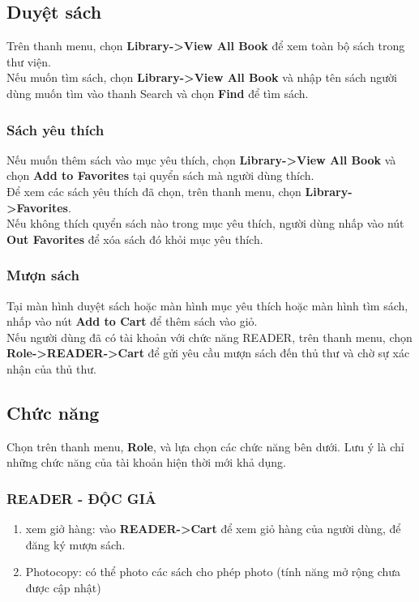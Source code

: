 \documentclass[12pt,a4paper]{report}
\begin{document}
		\subsection{Duyệt sách}
		Trên thanh menu, chọn \textbf{Library->View All Book} để xem toàn bộ sách trong thư viện.\\
		Nếu muốn tìm sách, chọn \textbf{Library->View All Book} và nhập tên sách người dùng muốn tìm vào thanh Search và chọn \textbf{Find} để tìm sách.\\
			\subsubsection{Sách yêu thích}
			Nếu muốn thêm sách vào mục yêu thích, chọn \textbf{Library->View All Book} và chọn \textbf{Add to Favorites} tại quyển sách mà người dùng thích.\\
			Để xem các sách yêu thích đã chọn, trên thanh menu, chọn \textbf{Library->Favorites}.\\
			Nếu không thích quyển sách nào trong mục yêu thích, người dùng nhấp vào nút \textbf{Out Favorites} để xóa sách đó khỏi mục yêu thích.\\
			\subsubsection{Mượn sách}
			Tại màn hình duyệt sách hoặc màn hình mục yêu thích hoặc màn hình tìm sách, nhấp vào nút \textbf{Add to Cart} để thêm sách vào giỏ.\\
			Nếu người dùng đã có tài khoản với chức năng READER, trên thanh menu, chọn \textbf{Role->READER->Cart} để gửi yêu cầu mượn sách đến thủ thư và chờ sự xác nhận của thủ thư.\\
		\subsection{Chức năng}
			Chọn trên thanh menu, \textbf{Role}, và lựa chọn các chức năng bên dưới. Lưu ý là chỉ những chức năng của tài khoản hiện thời mới khả dụng.\\
			\subsubsection{READER - ĐỘC GIẢ}
			\begin{enumerate}
				\item xem giở hàng: vào \textbf{READER->Cart} để xem giỏ hàng của người dùng, để đăng ký mượn sách.
				\item Photocopy: có thể photo các sách cho phép photo (tính năng mở rộng chưa được cập nhật)
			\end{enumerate}
\end{document}

